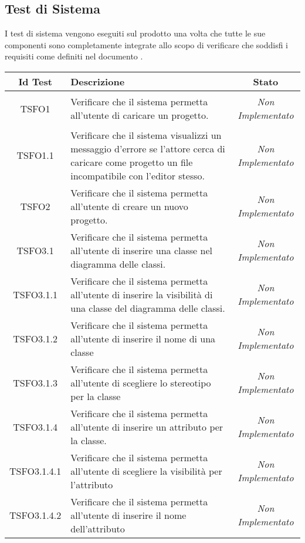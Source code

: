 \subsection{Test di Sistema}
I test di sistema vengono eseguiti sul prodotto una volta che tutte le sue componenti sono completamente integrate allo scopo di verificare che soddisfi i requisiti come definiti nel documento \AdR .
\normalsize
\begin{longtable}{|c|>{}m{8cm}|c|}
\hline 
\textbf{Id Test} & \textbf{Descrizione} & \textbf{Stato}\\
\hline
\endhead
\hypertarget{TSFO1}{TSFO1} & Verificare che il sistema permetta all'utente di caricare un progetto. & \textit{Non Implementato}\\ \hline
\hypertarget{TSFO1.1}{TSFO1.1} & Verificare che il sistema visualizzi un messaggio d'errore se l'attore cerca di caricare come progetto un file incompatibile con l'editor stesso. & \textit{Non Implementato}\\ \hline
\hypertarget{TSFO2}{TSFO2} & Verificare che il sistema permetta all'utente di creare un nuovo progetto. & \textit{Non Implementato}\\ \hline
\hypertarget{TSFO3.1}{TSFO3.1} & Verificare che il sistema permetta all'utente di inserire una classe nel diagramma delle classi. & \textit{Non Implementato}\\ \hline
\hypertarget{TSFO3.1.1}{TSFO3.1.1} & Verificare che il sistema permetta all'utente di inserire la visibilità di una classe del diagramma delle classi. & \textit{Non Implementato}\\ \hline
\hypertarget{TSFO3.1.2}{TSFO3.1.2} & Verificare che il sistema permetta all'utente di inserire il nome di una classe & \textit{Non Implementato}\\ \hline
\hypertarget{TSFO3.1.3}{TSFO3.1.3} & Verificare che il sistema permetta all'utente di scegliere lo stereotipo per la classe & \textit{Non Implementato}\\ \hline
\hypertarget{TSFO3.1.4}{TSFO3.1.4} & Verificare che il sistema permetta all'utente di inserire un attributo per la classe. & \textit{Non Implementato}\\ \hline
\hypertarget{TSFO3.1.4.1}{TSFO3.1.4.1} & Verificare che il sistema permetta all'utente di scegliere la visibilità per l'attributo & \textit{Non Implementato}\\ \hline
\hypertarget{TSFO3.1.4.2}{TSFO3.1.4.2} & Verificare che il sistema permetta all'utente di inserire il nome dell'attributo & \textit{Non Implementato}\\ \hline

\end{longtable}
